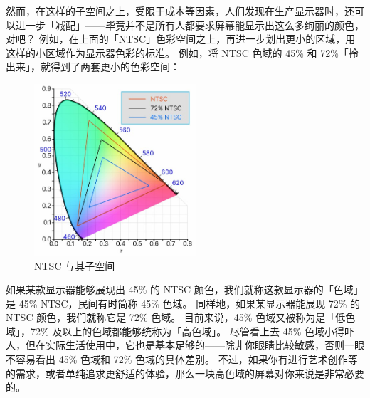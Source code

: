 然而，在这样的子空间之上，受限于成本等因素，人们发现在生产显示器时，还可以进一步「减配」——毕竟并不是所有人都要求屏幕能显示出这么多绚丽的颜色，对吧？
例如，在上面的「NTSC」色彩空间之上，再进一步划出更小的区域，用这样的小区域作为显示器色彩的标准。
例如，将 NTSC 色域的 45\% 和 72\%「拎出来」，就得到了两套更小的色彩空间：

\begin{figure}[htb!]
  \centering
  \includegraphics[width=6cm]{assets/NTSC_72_45.jpg}
  \caption{NTSC 与其子空间}
  \label{NTSC_72_45}
\end{figure}

如果某款显示器能够展现出 45\% 的 NTSC 颜色，我们就称这款显示器的「色域」是 45\% NTSC，民间有时简称 45\% 色域。
同样地，如果某显示器能展现 72\% 的 NTSC 颜色，我们就称它是 72\% 色域。
目前来说，45\% 色域又被称为是「低色域」，72\% 及以上的色域都能够统称为「高色域」。
尽管看上去 45\% 色域小得吓人，但在实际生活使用中，它也是基本足够的——除非你眼睛比较敏感，否则一眼不容易看出 45\% 色域和 72\% 色域的具体差别。
不过，如果你有进行艺术创作等的需求，或者单纯追求更舒适的体验，那么一块高色域的屏幕对你来说是非常必要的。

